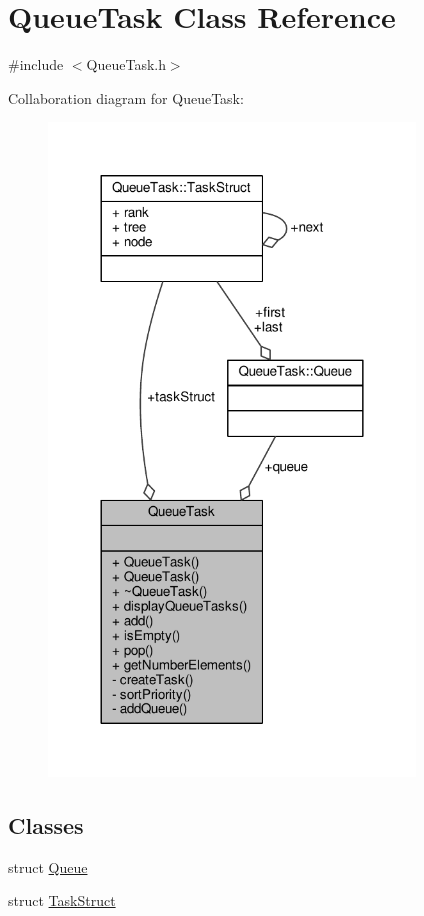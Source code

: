 \hypertarget{classQueueTask}{}\section{Queue\+Task Class Reference}
\label{classQueueTask}


{\ttfamily \#include $<$Queue\+Task.\+h$>$}



Collaboration diagram for Queue\+Task\+:
\nopagebreak
\begin{figure}[H]
\begin{center}
\leavevmode
\includegraphics[width=276pt]{classQueueTask__coll__graph}
\end{center}
\end{figure}
\subsection*{Classes}
\begin{DoxyCompactItemize}
\item 
struct \hyperlink{structQueueTask_1_1Queue}{Queue}
\item 
struct \hyperlink{structQueueTask_1_1TaskStruct}{Task\+Struct}
\end{DoxyCompactItemize}

